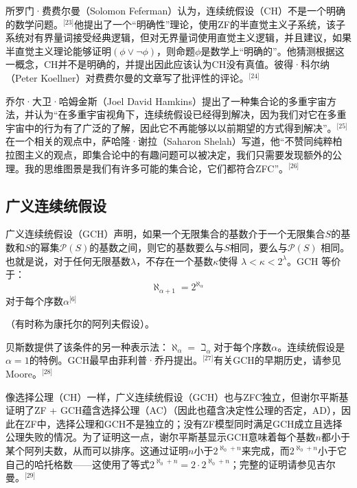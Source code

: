 所罗门·费费尔曼（Solomon Feferman）认为，连续统假设（CH）不是一个明确的数学问题。\(^\text{[23]}\)他提出了一个“明确性”理论，使用ZF的半直觉主义子系统，该子系统对有界量词接受经典逻辑，但对无界量词使用直觉主义逻辑，并且建议，如果半直觉主义理论能够证明\( (\phi \lor \neg \phi) \)，则命题\( \phi \)是数学上“明确的”。他猜测根据这一概念，CH并不是明确的，并提出因此应该认为CH没有真值。彼得·科尔纳（Peter Koellner）对费费尔曼的文章写了批评性的评论。\(^\text{[24]}\)

乔尔·大卫·哈姆金斯（Joel David Hamkins）提出了一种集合论的多重宇宙方法，并认为“在多重宇宙视角下，连续统假设已经得到解决，因为我们对它在多重宇宙中的行为有了广泛的了解，因此它不再能够以以前期望的方式得到解决”。\(^\text{[25]}\)在一个相关的观点中，萨哈隆·谢拉（Saharon Shelah）写道，他“不赞同纯粹柏拉图主义的观点，即集合论中的有趣问题可以被决定，我们只需要发现额外的公理。我的思维图景是我们有许多可能的集合论，它们都符合ZFC”。\(^\text{[26]}\)
\subsection{广义连续统假设}  
广义连续统假设（GCH）声明，如果一个无限集合的基数介于一个无限集合\( S \)的基数和\( S \)的幂集\( \mathcal{P}(S) \)的基数之间，则它的基数要么与\( S \)相同，要么与\( \mathcal{P}(S) \) 相同。也就是说，对于任何无限基数\( \lambda \)，不存在一个基数\( \kappa \)使得 \( \lambda < \kappa < 2^\lambda \)。GCH 等价于：
\[
\aleph_{\alpha + 1} = 2^{\aleph_{\alpha}}~
\]
对于每个序数\( \alpha \)\(^\text{[6]}\)  

（有时称为康托尔的阿列夫假设）。

贝斯数提供了该条件的另一种表示法：\(\aleph_{\alpha} = \beth_{\alpha}\)对于每个序数\( \alpha \)。连续统假设是\( \alpha = 1 \)的特例。GCH最早由菲利普·乔丹提出。\(^\text{[27]}\)有关GCH的早期历史，请参见Moore。\(^\text{[28]}\) 

像选择公理（CH）一样，广义连续统假设（GCH）也与ZFC独立，但谢尔平斯基证明了ZF + GCH蕴含选择公理（AC）（因此也蕴含决定性公理的否定，AD），因此在ZF中，选择公理和GCH不是独立的；没有ZF模型同时满足GCH成立且选择公理失败的情况。为了证明这一点，谢尔平斯基显示GCH意味着每个基数\( n \)都小于某个阿列夫数，从而可以排序。这通过证明\( n \)小于\( 2^{\aleph_0 + n} \)来完成，而\( 2^{\aleph_0 + n} \)小于它自己的哈托格数——这使用了等式\( 2^{\aleph_0 + n} = 2 \cdot 2^{\aleph_0 + n} \)；完整的证明请参见吉尔曼。\(^\text{[29]}\)

